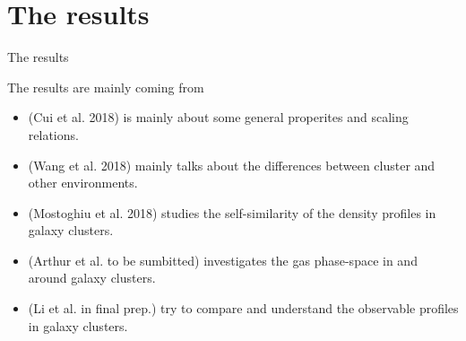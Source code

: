 \documentclass[aspectratio=43]{beamer}
\begin{document}
\section{The results}
\begin{frame}
  \begin{center}
    {\Huge The results} \\
    \bigskip
  \end{center}

  The results are mainly coming from
  \begin{itemize}
      \item     \hyperlink{intropaper}{} (Cui et al. 2018) is mainly about some general properites and scaling relations.
      \item \hyperlink{Wang}{} (Wang et al. 2018)  mainly talks about the differences between cluster and other environments.
      \item \hyperlink{Mostoghiu}{} (Mostoghiu et al. 2018) studies the self-similarity of the density profiles in galaxy clusters.
      \item \hyperlink{Arthur}{} (Arthur et al. to be sumbitted) investigates the gas phase-space in and around galaxy clusters.
      \item \hyperlink{Li}{} (Li et al. in final prep.) try to compare and understand the observable profiles in galaxy clusters.
  \end{itemize}
\end{frame}
\end{document}
